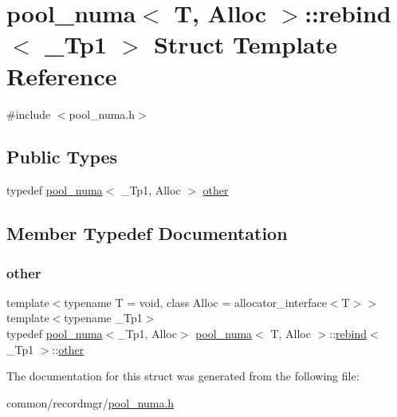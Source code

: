 \hypertarget{structpool__numa_1_1rebind}{}\section{pool\+\_\+numa$<$ T, Alloc $>$\+:\+:rebind$<$ \+\_\+\+Tp1 $>$ Struct Template Reference}
\label{structpool__numa_1_1rebind}


{\ttfamily \#include $<$pool\+\_\+numa.\+h$>$}

\subsection*{Public Types}
\begin{DoxyCompactItemize}
\item 
typedef \hyperlink{classpool__numa}{pool\+\_\+numa}$<$ \+\_\+\+Tp1, Alloc $>$ \hyperlink{structpool__numa_1_1rebind_a08dbfdbb4565e4b782245dc25f0a9018}{other}
\end{DoxyCompactItemize}


\subsection{Member Typedef Documentation}
\mbox{\label{structpool__numa_1_1rebind_a08dbfdbb4565e4b782245dc25f0a9018}} 
\subsubsection{\texorpdfstring{other}{other}}
{\footnotesize\ttfamily template$<$typename T  = void, class Alloc  = allocator\+\_\+interface$<$\+T$>$$>$ \\
template$<$typename \+\_\+\+Tp1$>$ \\
typedef \hyperlink{classpool__numa}{pool\+\_\+numa}$<$\+\_\+\+Tp1, Alloc$>$ \hyperlink{classpool__numa}{pool\+\_\+numa}$<$ T, Alloc $>$\+::\hyperlink{structpool__numa_1_1rebind}{rebind}$<$ \+\_\+\+Tp1 $>$\+::\hyperlink{structpool__numa_1_1rebind_a08dbfdbb4565e4b782245dc25f0a9018}{other}}



The documentation for this struct was generated from the following file\+:\begin{DoxyCompactItemize}
\item 
common/recordmgr/\hyperlink{pool__numa_8h}{pool\+\_\+numa.\+h}\end{DoxyCompactItemize}
